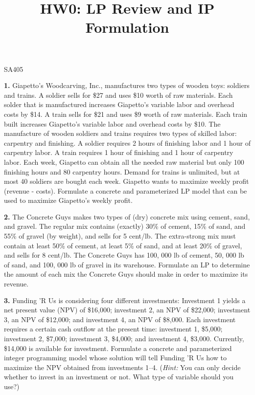 \documentclass[11pt]{article}
\makeatletter
\theoremstyle{definition}
\renewcommand{\maketitle}{
  \noindent SA405 

  \begin{center}\Large{\textbf{\@title}}\end{center}
}
\makeatother
\begin{document}
\title{HW0: LP Review and IP Formulation}


\maketitle

\textbf{1.} Giapetto’s Woodcarving, Inc., manufactures two types of wooden toys: soldiers and trains. A soldier sells for \$27 and uses \$10 worth of raw materials. Each solder that is manufactured increases Giapetto’s variable labor and overhead costs by \$14. A train sells for \$21 and uses \$9 worth of raw materials. Each train built increases Giapetto’s variable labor and overhead costs by \$10. The manufacture of wooden soldiers and trains requires two types of skilled labor: carpentry and finishing. A soldier requires 2 hours of finishing labor and 1 hour of carpentry labor. A train requires 1 hour of finishing and 1 hour of carpentry labor. Each week, Giapetto can obtain all the needed raw material but only 100 finishing hours and 80 carpentry hours. Demand for trains is unlimited, but at most 40 soldiers are bought each week. Giapetto wants to maximize weekly profit (revenue - costs). Formulate a concrete and parameterized LP model that can be used to maximize Giapetto’s weekly profit.

\vspace{1in}

\textbf{2.} The Concrete Guys makes two types of (dry) concrete mix using cement, sand, and gravel. The regular mix contains (exactly) 30\% of cement, 15\% of sand, and 55\% of gravel (by weight), and sells for 5 cent/lb. The extra-strong mix must contain at least 50\% of cement, at least 5\% of sand, and at least 20\% of gravel, and sells for 8 cent/lb. The Concrete Guys has 100, 000 lb of cement, 50, 000 lb of sand, and 100, 000 lb of gravel in its warehouse. Formulate an LP to determine the amount of each mix the Concrete Guys should make in order to maximize its revenue.

\vspace{1in}

\textbf{3.} Funding 'R Us is considering four different investments: Investment 1 yields a net present value (NPV) of \$16,000; investment 2, an NPV of \$22,000; investment 3, an NPV of \$12,000; and investment 4, an NPV of \$8,000. Each investment requires a certain cash outflow at the present time: investment 1, \$5,000; investment 2, \$7,000; investment 3, \$4,000; and investment 4, \$3,000. Currently, \$14,000 is available for investment. Formulate a concrete and parameterized integer programming model whose solution will tell Funding 'R Us how to maximize the NPV obtained from investments 1--4. (\emph{Hint:} You can only decide whether to invest in an investment or not. What type of variable should you use?)  
\end{document}
